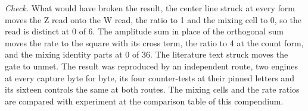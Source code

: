 \begin{chproof}
\emph{Check.} What would have broken the result, the center line struck at every form moves the Z read onto the W read, the ratio to 1 and the mixing cell to 0, so the read is distinct at 0 of 6. The amplitude sum in place of the orthogonal sum moves the rate to the square with its cross term, the ratio to 4 at the count form, and the mixing identity parts at 0 of 36. The literature text struck moves the gate to unmet. The result was reproduced by an independent route, two engines at every capture byte for byte, its four counter-tests at their pinned letters and its sixteen controls the same at both routes.
The mixing cells and the rate ratios are compared with experiment at the comparison table of this compendium.
\end{chproof}
\label{chend:VI-4-D538865-nczr-t1}

